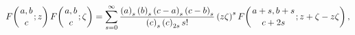 \[\mathop{F\/}\nolimits\!\left({a,b\atop c};z\right)\mathop{F\/}\nolimits\!\left%
({a,b\atop c};\zeta\right)=\sum_{s=0}^{\infty}\frac{\left(a\right)_{s}\left(b%
\right)_{s}\left(c-a\right)_{s}\left(c-b\right)_{s}}{\left(c\right)_{s}\left(c%
\right)_{2s}s!}\left(z\zeta\right)^{s}\mathop{F\/}\nolimits\!\left({a+s,b+s%
\atop c+2s};z+\zeta-z\zeta\right),\]